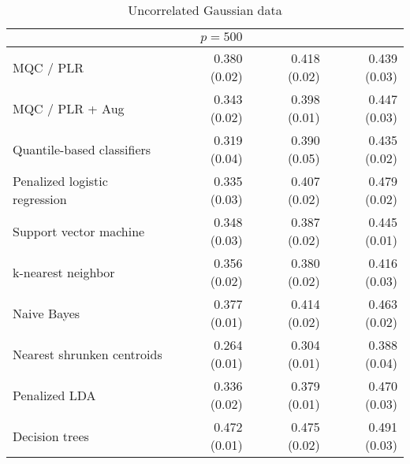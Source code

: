 \begin{table}[p]
\begin{adjustbox}{max size={\textwidth}{10cm}}
\begin{tabular}{l@{\extracolsep{15mm}}rrr}
      \hline
      & $p = 500$ \\
      \hline

      MQC / PLR & 0.380 (0.02) & 0.418 (0.02) & 0.439 (0.03) \\ 
      MQC / PLR + Aug & 0.343 (0.02) & 0.398 (0.01) & 0.447 (0.03) \\ 
      Quantile-based classifiers & 0.319 (0.04) & 0.390 (0.05) & 0.435 (0.02) \\ 
      Penalized logistic regression & 0.335 (0.03) & 0.407 (0.02) & 0.479 (0.02) \\ 
      Support vector machine & 0.348 (0.03) & 0.387 (0.02) & 0.445 (0.01) \\ 
      k-nearest neighbor & 0.356 (0.02) & 0.380 (0.02) & 0.416 (0.03) \\ 
      Naive Bayes & 0.377 (0.01) & 0.414 (0.02) & 0.463 (0.02) \\ 
      Nearest shrunken centroids & 0.264 (0.01) & 0.304 (0.01) & 0.388 (0.04) \\ 
      Penalized LDA & 0.336 (0.02) & 0.379 (0.01) & 0.470 (0.03) \\ 
      Decision trees & 0.472 (0.01) & 0.475 (0.02) & 0.491 (0.03) \\ 
      \hline
      
      \end{tabular}
    \end{adjustbox}
    \caption{Uncorrelated Gaussian data}
\end{table}


